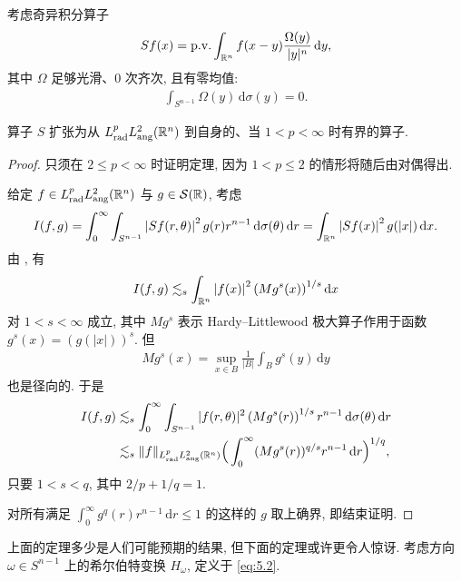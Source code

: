 考虑奇异积分算子
\begin{align*}
  S f(x)=\mathrm{p.v.}\int_{\mathbb{R}^{n}}f(x-y)\frac{\Omega(y)}{|y|^{n}}\,\mathrm{d}y,
\end{align*}
其中 $\Omega$ 足够光滑、$0$ 次齐次, 且有零均值:
\begin{align*}
  \int_{S^{n-1}}\Omega(y)\,\mathrm{d}\sigma(y)=0.
\end{align*}

\begin{theorem}\label{thm:6.6}
算子 $S$ 扩张为从 $L_{\mathrm{rad}}^{p}L_{\mathrm{ang}}^{2}(\mathbb{R}^{n})$ 到自身的、当 $1 < p < \infty$ 时有界的算子.
\end{theorem}

\begin{proof}
只须在 $2 \leq p < \infty$ 时证明定理, 因为 $1 < p \leq 2$ 的情形将随后由对偶得出.

给定 $f \in L_{\mathrm{rad}}^{p}L_{\mathrm{ang}}^{2}(\mathbb{R}^{n})$ 与 $g \in \mathcal{S}(\mathbb{R})$, 考虑
\begin{align*}
  I(f,g)=\int_{0}^{\infty}\int_{S^{n-1}}\left|S f(r,\theta)\right|^{2}g(r)r^{n-1}\,\mathrm{d}\sigma(\theta)\,\mathrm{d}r
  =\int_{\mathbb{R}^{n}}\left|S f(x)\right|^{2}g(|x|)\,\mathrm{d}x.
\end{align*}
由 \cite{b84}, 有
\begin{align*}
  I(f,g)\lesssim_{s}\int_{\mathbb{R}^{n}}\left|f(x)\right|^{2}\left(M g^{s}(x)\right)^{1/s}\mathrm{d}x
\end{align*}
对 $1 < s < \infty$ 成立, 其中 $Mg^{s}$ 表示 Hardy--Littlewood 极大算子作用于函数 $g^{s}(x) = (g(|x|))^{s}$. 但
\begin{align*}
  Mg^{s}(x)=\sup_{x\in B}\frac{1}{|B|}\int_{B}g^{s}(y)\,\mathrm{d}y
\end{align*}
也是径向的. 于是
\begin{align*}
  I(f,g)
  &\lesssim_{s}\int_{0}^{\infty}\int_{S^{n-1}}|f(r,\theta)|^{2}\left(Mg^{s}(r)\right)^{1/s}r^{n-1}\,\mathrm{d}\sigma(\theta)\,\mathrm{d}r\\
  &\lesssim_{s}\|f\|_{L_{\mathrm{rad}}^{p}L_{\mathrm{ang}}^{2}(\mathbb{R}^{n})}
   \Big(\int_{0}^{\infty}(Mg^{s}(r))^{q/s}r^{n-1}\,\mathrm{d}r\Big)^{1/q},
\end{align*}
只要 $1 < s < q$, 其中 $2/p + 1/q = 1$.

对所有满足 $\int_{0}^{\infty} g^{q}(r)r^{n-1}\,\mathrm{d}r \leq 1$ 的这样的 $g$ 取上确界, 即结束证明.
\end{proof}

上面的定理多少是人们可能预期的结果, 但下面的定理或许更令人惊讶. 考虑方向 $\omega \in S^{n-1}$ 上的希尔伯特变换 $H_\omega$, 定义于 \eqref{eq:5.2}.

